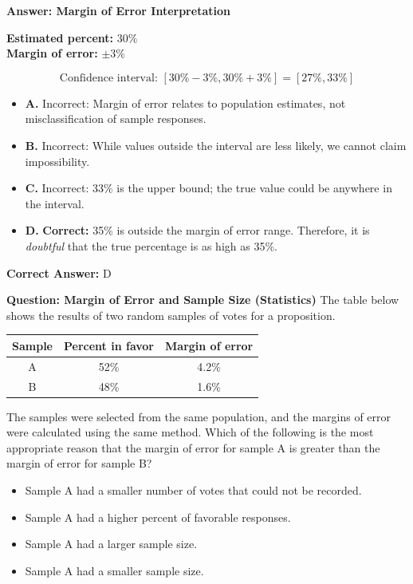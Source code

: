 \documentclass{beamer}
\begin{document}
\begin{frame}{\textbf{Answer: Margin of Error Interpretation}}

\textbf{Estimated percent:} \( 30\% \) \\
\textbf{Margin of error:} \( \pm 3\% \)

\[
\text{Confidence interval: } [30\% - 3\%, 30\% + 3\%] = [27\%, 33\%]
\]

\begin{itemize}
    \item \textbf{A.} Incorrect: Margin of error relates to population estimates, not misclassification of sample responses.
    \item \textbf{B.} Incorrect: While values outside the interval are less likely, we cannot claim impossibility.
    \item \textbf{C.} Incorrect: 33\% is the upper bound; the true value could be anywhere in the interval.
    \item \textbf{D.} \textbf{Correct:} 35\% is outside the margin of error range. Therefore, it is \emph{doubtful} that the true percentage is as high as 35\%.
\end{itemize}

\textbf{Correct Answer:} \(\boxed{\text{D}}\)

\end{frame}

\begin{frame}{\textbf{Question: Margin of Error and Sample Size (Statistics)}}
\small
The table below shows the results of two random samples of votes for a proposition.

\begin{center}
\renewcommand{\arraystretch}{1.2}
\setlength{\tabcolsep}{12pt}
\begin{tabular}{|c|c|c|}
\hline
\textbf{Sample} & \textbf{Percent in favor} & \textbf{Margin of error} \\
\hline
A & 52\% & 4.2\% \\
B & 48\% & 1.6\% \\
\hline
\end{tabular}
\end{center}

The samples were selected from the same population, and the margins of error were calculated using the same method. Which of the following is the most appropriate reason that the margin of error for sample A is greater than the margin of error for sample B?

\begin{itemize}
    \item[A.] Sample A had a smaller number of votes that could not be recorded.
    \item[B.] Sample A had a higher percent of favorable responses.
    \item[C.] Sample A had a larger sample size.
    \item[D.] Sample A had a smaller sample size.
\end{itemize}
\end{frame}
\end{document}
